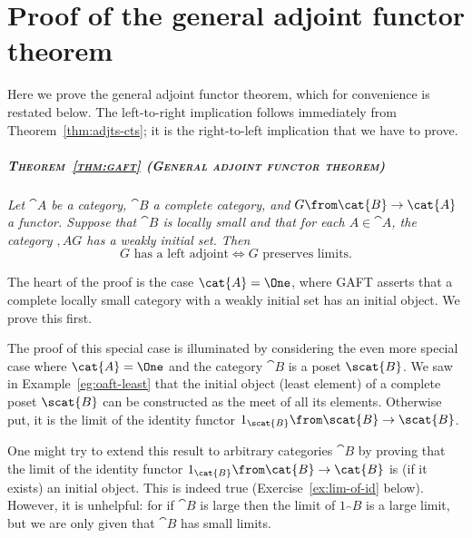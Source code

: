% 
% 
% 

\chapter{Proof of the general adjoint functor theorem}

%
%
%

Here we prove the general adjoint functor theorem, which for convenience is
restated below.  The left-to-right implication follows immediately from
Theorem~\ref{thm:adjts-cts}; it is the right-to-left implication that we
have to prove.

\paragraph*{\normalfont\scshape Theorem~\ref{thm:gaft} (General adjoint functor theorem)} 
{\itshape
Let $\cat{A}$ be a category, $\cat{B}$ a complete category, and $G\from
\cat{B} \to \cat{A}$ a functor.  Suppose that $\cat{B}$ is locally small and
that for each $A \in \cat{A}$, the category $\comma{A}{G}$ has a weakly%
%
%
%
initial set.  Then
\[
G \text{ has a left adjoint}
\iff
G \text{ preserves limits}.
\]
}

The heart of the proof is the case $\cat{A} = \One$, where GAFT asserts
that a complete locally small category with a weakly initial set has an
initial object.  We prove this first.

The proof of this special case is illuminated by considering the even more
special case where $\cat{A} = \One$ and the category $\cat{B}$ is a poset
$\scat{B}$.  We saw in Example~\ref{eg:oaft-least} that the initial object
(least%
%
%
element) of a complete poset $\scat{B}$ can be constructed as the meet of
all its elements.  Otherwise put, it is the limit of the identity functor
$1_\scat{B}\from \scat{B} \to \scat{B}$.

One might try to extend this result to arbitrary categories $\cat{B}$ by
proving that the limit of the identity%
%
%
%
%
functor $1_\cat{B}\from \cat{B} \to \cat{B}$ is (if it exists) an initial
object.  This is indeed true (Exercise~\ref{ex:lim-of-id} below).  However,
it is unhelpful: for if $\cat{B}$ is large then the limit of $1_\cat{B}$
is a large%
%
%
limit, but we are only given that $\cat{B}$ has small limits.

